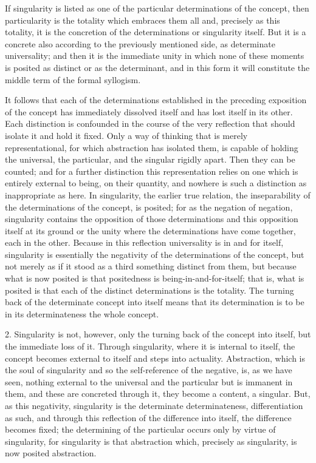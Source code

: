 If singularity is listed as one of the
particular determinations of the concept,
then particularity is the totality
which embraces them all
and, precisely as this totality,
it is the concretion of the determinations
or singularity itself.
But it is a concrete also according
to the previously mentioned side,
as determinate universality;
and then it is the immediate unity
in which none of these moments is posited
as distinct or as the determinant,
and in this form it will constitute
the middle term of the formal syllogism.

It follows that each of the determinations
established in the preceding exposition of the concept
has immediately dissolved itself
and has lost itself in its other.
Each distinction is confounded
in the course of the very reflection
that should isolate it and hold it fixed.
Only a way of thinking that is merely representational,
for which abstraction has isolated them,
is capable of holding the universal, the particular,
and the singular rigidly apart.
Then they can be counted;
and for a further distinction
this representation relies on one
which is entirely external to being,
on their quantity,
and nowhere is such a distinction as inappropriate as here.
In singularity, the earlier true relation,
the inseparability of the determinations of the concept,
is posited;
for as the negation of negation,
singularity contains the opposition
of those determinations
and this opposition itself at its ground
or the unity where the determinations have
come together, each in the other.
Because in this reflection
universality is in and for itself,
singularity is essentially the negativity of
the determinations of the concept,
but not merely as if it stood as
a third something distinct from them,
but because what is now posited is
that positedness is being-in-and-for-itself;
that is, what is posited is that
each of the distinct determinations is the totality.
The turning back of the determinate concept into itself
means that its determination is to be
in its determinateness the whole concept.

2. Singularity is not, however, only the turning back
of the concept into itself, but the immediate loss of it.
Through singularity, where it is internal to itself,
the concept becomes external to itself and steps into actuality.
Abstraction, which is the soul of singularity
and so the self-reference of the negative,
is, as we have seen, nothing external to
the universal and the particular
but is immanent in them,
and these are concreted through it,
they become a content, a singular.
But, as this negativity, singularity is
the determinate determinateness, differentiation as such,
and through this reflection of the difference into itself,
the difference becomes fixed;
the determining of the particular occurs
only by virtue of singularity,
for singularity is that abstraction which,
precisely as singularity,
is now posited abstraction.

